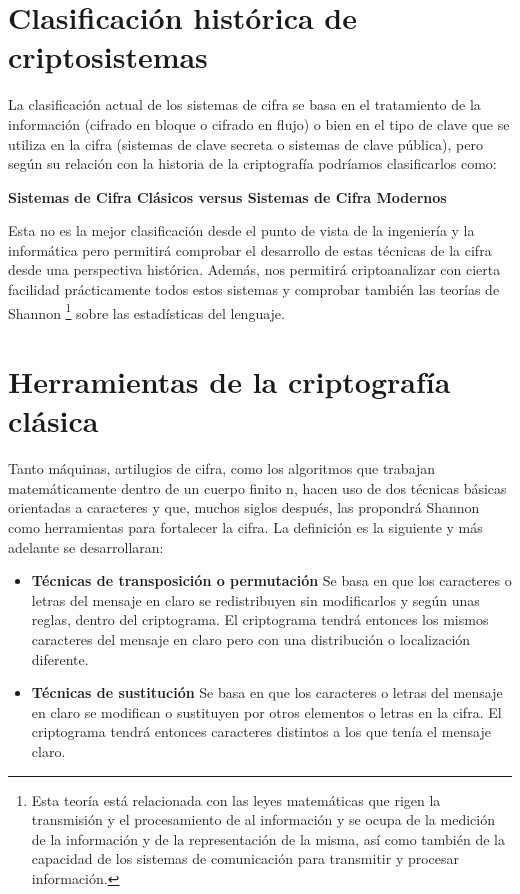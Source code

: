 \documentclass{article}
\begin{document}
\section{Clasificación histórica de criptosistemas}
\justify
La clasificación actual de los sistemas de cifra se basa en el tratamiento de la información (cifrado en bloque o cifrado en flujo) o bien en el tipo de clave que se utiliza en la cifra (sistemas de clave secreta o sistemas de clave pública), pero según su relación con la historia de la criptografía podríamos clasificarlos como: 
\begin{center}
    \textbf{Sistemas de Cifra Clásicos versus Sistemas de Cifra Modernos} 
\end{center}
\justify
Esta no es la mejor clasificación desde el punto de vista de la ingeniería y la informática pero permitirá comprobar el desarrollo de estas técnicas de la cifra desde una perspectiva histórica. Además, nos permitirá criptoanalizar con cierta facilidad prácticamente todos estos sistemas y comprobar también las teorías de Shannon \footnote{Esta teoría está relacionada con las leyes matemáticas que rigen la transmisión y el procesamiento de al información y se ocupa de la medición de la información y de la representación de la misma, así como también de la capacidad de los sistemas de comunicación para transmitir y procesar información.} sobre las estadísticas del lenguaje. 


\section{Herramientas de la criptografía clásica}
\justify
Tanto máquinas, artilugios de cifra, como los algoritmos que trabajan matemáticamente dentro de un cuerpo finito n, hacen uso de dos técnicas básicas orientadas a caracteres y que, muchos siglos después, las propondrá Shannon como herramientas para fortalecer la cifra. La definición es la siguiente y más adelante se desarrollaran:
\justify
 
\begin{itemize}
    \item \textbf{Técnicas de transposición o permutación} Se basa en que los caracteres o letras del mensaje en claro se redistribuyen sin modificarlos y según unas reglas, dentro del criptograma. El criptograma tendrá entonces los mismos caracteres del mensaje en claro pero con una distribución o localización diferente.
    \item \textbf{Técnicas de sustitución} Se basa en que los caracteres o letras del mensaje en claro se modifican o sustituyen por otros elementos o letras en la cifra. El criptograma tendrá entonces caracteres distintos a los que tenía el mensaje claro. 
\end{itemize}
\newpage
\end{document}
